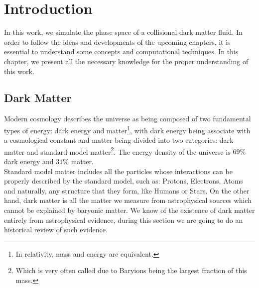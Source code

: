 \setlength{\headheight}{15pt} 
\chapter{Introduction}
In this work, we simulate the phase space of a collisional dark matter fluid.
In order to follow the ideas and developments of the upcoming chapters, it is essential to understand some concepts and computational techniques.
In this chapter, we present all the necessary knowledge for the proper understanding of this work.
\section{Dark Matter}
Modern cosmology describes the universe as being composed of two fundamental types of energy: dark energy and matter\footnote{In relativity, mass and energy are equivalent.}, with dark energy being associate with a cosmological constant and matter being divided into two categories: dark matter and standard model matter\footnote{Which is very often called  due to Baryions being the largest fraction of this mass.}.
The energy density of the universe is $69\%$ dark energy and $31\%$ matter.\\


Standard model matter includes all the particles whose interactions can be properly described by the standard model, such as: Protons, Electrons, Atoms and naturally, any structure that they form, like Humans or Stars.
On the other hand, dark matter is all the matter we measure from astrophysical sources which cannot be explained by baryonic matter.
We know of the existence of dark matter entirely from astrophysical evidence, during this section we are going to do an historical review of such evidence.\\

